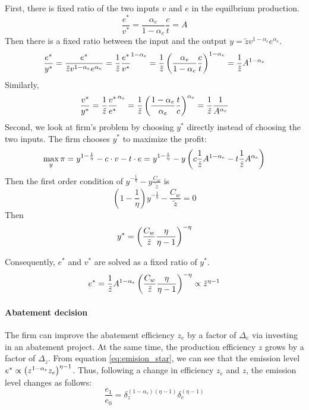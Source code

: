 \documentclass[12pt]{article}[margin=1in]
\begin{document}
First, there is fixed ratio of the two inputs $v$ and $e$ in the equilbrium production.
$$ \frac{e^*}{v^*} = \frac{\alpha_e}{1-\alpha_e} \frac{c}{t} = A$$
Then there is a fixed ratio between the input and the output $y = \tilde{z}v^{1-\alpha_e}e^{\alpha_e}$.
$$ \frac{e^*}{y^*} = \frac{e^*}{\tilde{z}v^{1-\alpha_e}e^{\alpha_e}} = \frac{1}{\tilde{z}}\frac{e^*}{v^*}^{1-\alpha_e} = \frac{1}{\tilde{z}}\left(\frac{\alpha_e}{1-\alpha_e}\frac{c}{t}\right)^{1-\alpha_e}=\frac{1}{\tilde{z}}A^{1-\alpha_e}$$
Similarly, $$\frac{v^*}{y^*} = \frac{1}{\tilde{z}}\frac{v^*}{e^*}^{\alpha_e} = \frac{1}{\tilde{z}}\left(\frac{1-\alpha_e}{\alpha_e}\frac{t}{c}\right)^{\alpha_e}=\frac{1}{\tilde{z}}\frac{1}{A^{\alpha_e}}$$
Second, we look at firm's problem by choosing $y^*$ directly instead of choosing the two inputs. The firm chooses $y^*$ to maximize the profit:
$$\max_{y} \pi = y^{1-\frac{1}{\eta}} - c \cdot v-t \cdot e = y^{1-\frac{1}{\eta}} - y\left(c \frac{1}{\tilde{z}}A^{1-\alpha_e}-t \frac{1}{\tilde{z}}A^{\alpha_e}\right)$$
Then the first order condition of $y^{-\frac{1}{\eta}} - y\frac{C_w}{\tilde{z}}$ is
$$(1-\frac{1}{\eta})y^{-\frac{1}{\eta}}-\frac{C_w}{\tilde{z}} = 0$$
Then
\begin{equation}\label{eq:y_star}
    y^* = \left(\frac{C_w}{\tilde{z}}\frac{\eta}{\eta-1}\right)^{-\eta}
\end{equation}

Consequently, $e^*$ and $v^*$ are solved as a fixed ratio of $y^*$.
\begin{equation}\label{eq:emission_star}
    e^* = \frac{1}{\tilde{z}}A^{1-\alpha_e}\left(\frac{C_w}{\tilde{z}}\frac{\eta}{\eta-1}\right)^{-\eta} \propto \tilde{z}^{\eta-1}
\end{equation}


\paragraph{Abatement decision} The firm can improve the abatement efficiency $z_e$ by a factor of $\Delta_e$ via investing in an abatement project. At the same time, the production efficiency $z$ grows by a factor of $\Delta_z$.
From equation \ref{eq:emision_star}, we can see that the emission level $e^* \propto \left(z^{1-\alpha_e}z_e\right)^{\eta-1}$. Thus, following a change in efficiency $z_e$ and $z$, the emission level changes as follows:
\begin{equation}\label{eq:emission_change}
    \frac{e_1}{e_0} = \delta_z^{(1-\alpha_e)(\eta-1)}\delta_e^{(\eta-1)}
\end{equation}
\end{document}
